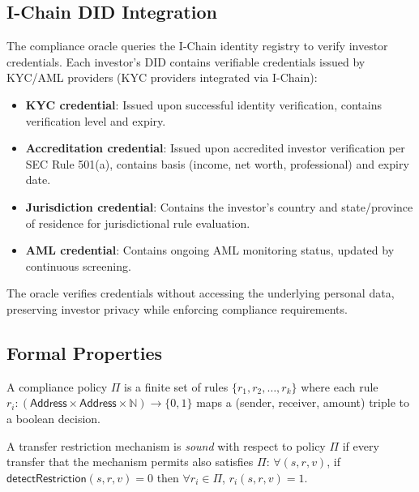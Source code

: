 \subsection{I-Chain DID Integration}

The compliance oracle queries the I-Chain identity registry to verify investor credentials. Each investor's DID contains verifiable credentials issued by KYC/AML providers (KYC providers integrated via I-Chain):

\begin{itemize}[nosep]
  \item \textbf{KYC credential}: Issued upon successful identity verification, contains verification level and expiry.
  \item \textbf{Accreditation credential}: Issued upon accredited investor verification per SEC Rule 501(a), contains basis (income, net worth, professional) and expiry date.
  \item \textbf{Jurisdiction credential}: Contains the investor's country and state/province of residence for jurisdictional rule evaluation.
  \item \textbf{AML credential}: Contains ongoing AML monitoring status, updated by continuous screening.
\end{itemize}

The oracle verifies credentials without accessing the underlying personal data, preserving investor privacy while enforcing compliance requirements.

\subsection{Formal Properties}

\begin{definition}
A compliance policy $\Pi$ is a finite set of rules $\{r_1, r_2, \ldots, r_k\}$ where each rule $r_i : (\textsf{Address} \times \textsf{Address} \times \mathbb{N}) \to \{0, 1\}$ maps a (sender, receiver, amount) triple to a boolean decision.
\end{definition}

\begin{definition}
A transfer restriction mechanism is \emph{sound} with respect to policy $\Pi$ if every transfer that the mechanism permits also satisfies $\Pi$: $\forall (s, r, v)$, if $\textsf{detectRestriction}(s, r, v) = 0$ then $\forall r_i \in \Pi$, $r_i(s, r, v) = 1$.
\end{definition}

